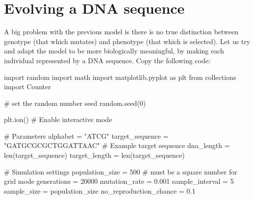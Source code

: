\documentclass[
  letterpaper,
  DIV=11,
  numbers=noendperiod]{scrreprt}
\newenvironment{Shaded}{\begin{snugshade}}{\end{snugshade}}
\newcommand{\BuiltInTok}[1]{\textcolor[rgb]{0.00,0.23,0.31}{#1}}
\newcommand{\CommentTok}[1]{\textcolor[rgb]{0.37,0.37,0.37}{#1}}
\newcommand{\DecValTok}[1]{\textcolor[rgb]{0.68,0.00,0.00}{#1}}
\newcommand{\FloatTok}[1]{\textcolor[rgb]{0.68,0.00,0.00}{#1}}
\newcommand{\ImportTok}[1]{\textcolor[rgb]{0.00,0.46,0.62}{#1}}
\newcommand{\NormalTok}[1]{\textcolor[rgb]{0.00,0.23,0.31}{#1}}
\newcommand{\OperatorTok}[1]{\textcolor[rgb]{0.37,0.37,0.37}{#1}}
\newcommand{\StringTok}[1]{\textcolor[rgb]{0.13,0.47,0.30}{#1}}
\theoremstyle{definition}
\theoremstyle{remark}
\begin{document}
\section{Evolving a DNA sequence}\label{evolving-a-dna-sequence}

A big problem with the previous model is there is no true distinction
between genotype (that which mutates) and phenotype (that which is
selected). Let us try and adapt the model to be more biologically
meaningful, by making each individual represented by a DNA sequence.
Copy the following code:

\begin{tcolorbox}[enhanced jigsaw, left=2mm, opacitybacktitle=0.6, toptitle=1mm, colbacktitle=quarto-callout-note-color!10!white, toprule=.15mm, coltitle=black, colframe=quarto-callout-note-color-frame, opacityback=0, title=\textcolor{quarto-callout-note-color}{\faInfo}\hspace{0.5em}{Starting code for ``evolving a DNA sequence''}, breakable, bottomtitle=1mm, rightrule=.15mm, titlerule=0mm, arc=.35mm, leftrule=.75mm, bottomrule=.15mm, colback=white]

\begin{Shaded}
\begin{Highlighting}[]
\ImportTok{import}\NormalTok{ random}
\ImportTok{import}\NormalTok{ math}
\ImportTok{import}\NormalTok{ matplotlib.pyplot }\ImportTok{as}\NormalTok{ plt}
\ImportTok{from}\NormalTok{ collections }\ImportTok{import}\NormalTok{ Counter}

\CommentTok{\# set the random number seed}
\NormalTok{random.seed(}\DecValTok{0}\NormalTok{)}

\NormalTok{plt.ion()  }\CommentTok{\# Enable interactive mode}

\CommentTok{\# Parameters}
\NormalTok{alphabet }\OperatorTok{=} \StringTok{"ATCG"}
\NormalTok{target\_sequence }\OperatorTok{=} \StringTok{"GATGCGCGCTGGATTAAC"}  \CommentTok{\# Example target sequence}
\NormalTok{dna\_length }\OperatorTok{=} \BuiltInTok{len}\NormalTok{(target\_sequence)}
\NormalTok{target\_length }\OperatorTok{=} \BuiltInTok{len}\NormalTok{(target\_sequence)}

\CommentTok{\# Simulation settings}
\NormalTok{population\_size }\OperatorTok{=} \DecValTok{500}  \CommentTok{\# must be a square number for grid mode}
\NormalTok{generations }\OperatorTok{=} \DecValTok{20000}
\NormalTok{mutation\_rate }\OperatorTok{=} \FloatTok{0.001}
\NormalTok{sample\_interval }\OperatorTok{=} \DecValTok{5}
\NormalTok{sample\_size }\OperatorTok{=}\NormalTok{ population\_size}
\NormalTok{no\_reproduction\_chance }\OperatorTok{=} \FloatTok{0.1}


\end{Highlighting}
\end{Shaded}
\end{tcolorbox}
\end{document}
